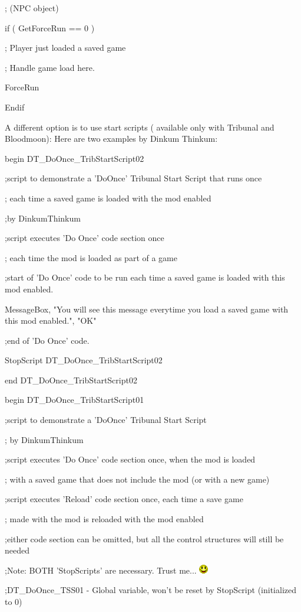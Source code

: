 \documentclass[
]{article}
\begin{document}
; (NPC object)

if ( GetForceRun == 0 )

; Player just loaded a saved game

; Handle game load here.

ForceRun

Endif

A different option is to use start scripts ( available only with
Tribunal and Bloodmoon): Here are two examples by Dinkum Thinkum:

begin DT\_DoOnce\_TribStartScript02

;script to demonstrate a 'DoOnce' Tribunal Start Script that runs once

; each time a saved game is loaded with the mod enabled

;by DinkumThinkum

;script executes 'Do Once' code section once

; each time the mod is loaded as part of a game

;start of 'Do Once' code to be run each time a saved game is loaded with
this mod enabled.

MessageBox, "You will see this message everytime you load a saved game
with this mod enabled.", "OK"

;end of 'Do Once' code.

StopScript DT\_DoOnce\_TribStartScript02

end DT\_DoOnce\_TribStartScript02

begin DT\_DoOnce\_TribStartScript01

;script to demonstrate a 'DoOnce' Tribunal Start Script

; by DinkumThinkum

;script executes 'Do Once' code section once, when the mod is loaded

; with a saved game that does not include the mod (or with a new game)

;script executes 'Reload' code section once, each time a save game

; made with the mod is reloaded with the mod enabled

;either code section can be omitted, but all the control structures will
still be needed

;Note: BOTH 'StopScripts' are necessary. Trust me...
\includegraphics{media/image5.png}

;DT\_DoOnce\_TSS01 - Global variable, won't be reset by StopScript
(initialized to 0)
\end{document}
